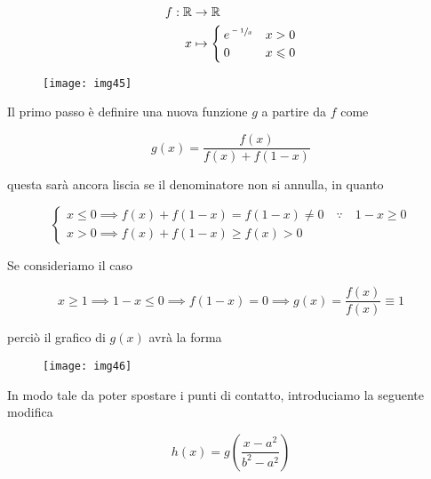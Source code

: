 \begin{align}
	\begin{split}
		f : \mathbb{R} &\to \mathbb{R}\\
		x &\mapsto%
		\begin{cases}
			e^{\sfrac{-1}{x}} & x > 0\\
			0 & x \leqslant 0
		\end{cases}
	\end{split}
\end{align}

\begin{figure}[H]
	\centering
	\texttt{[image: img45]}
\end{figure}

Il primo passo è definire una nuova funzione $ g $ a partire da $ f $ come


\begin{equation}
	g(x) = \dfrac{f(x)}{f(x) + f(1-x)}
\end{equation}

questa sarà ancora liscia se il denominatore non si annulla, in quanto

\begin{equation}
	\begin{cases}
		x \leqslant 0 \implies f(x) + f(1-x) = f(1-x) \neq 0 \quad \because \quad 1-x \geqslant 0\\
		x > 0 \implies f(x) + f(1-x) \geqslant f(x) > 0
	\end{cases}
\end{equation}

Se consideriamo il caso

\begin{equation}
	x \geqslant 1 \implies 1-x \leqslant 0 \implies f(1-x)=0 \implies g(x) = \dfrac{f(x)}{f(x)} \equiv 1
\end{equation}

perciò il grafico di $ g(x) $ avrà la forma

\begin{figure}[H]
	\centering
	\texttt{[image: img46]}
\end{figure}

In modo tale da poter spostare i punti di contatto, introduciamo la seguente modifica

\begin{equation}
	h(x) = g \left( \dfrac{x - a^{2}}{b^{2} - a^{2}} \right)
\end{equation}

